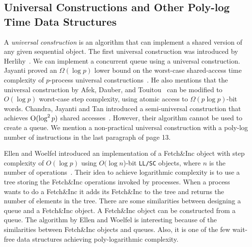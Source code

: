 \subsection{Universal Constructions and Other Poly-log Time Data Structures}
A \textit{universal construction} is an algorithm that can implement a
shared version of any given sequential object. The first universal
construction was introduced by
Herlihy~\cite{10.1145/114005.102808}. We can implement a concurrent
queue using a universal construction. Jayanti proved an $\Omega(\log
p)$ lower bound on the worst-case shared-access time complexity of
$p$-process universal
constructions~\cite{DBLP:conf/podc/Jayanti98a}. He also mentions that
the universal construction by Afek, Dauber, and
Touitou~\cite{DBLP:conf/stoc/AfekDT95} can be modified to $O(\log p)$
worst-case step complexity, using atomic access to $\Omega(p \log
p)$-bit words. Chandra, Jayanti and Tan introduced a semi-universal
construction that achieves $\textsc{O}(\log^2 p)$ shared
accesses~\cite{DBLP:conf/podc/ChandraJT98}. However, their algorithm
cannot be used to create a queue. We mention a non-practical universal
construction with a poly-log number of  instructions in the
last paragraph of page 13. 

Ellen and Woelfel introduced an implementation of a Fetch\&Inc object
with step complexity of $O(\log p)$ using $O(\log n$)-bit
\texttt{LL/SC} objects, where $n$ is the number of
operations~\cite{10.1007/978-3-642-41527-2_20}. Their idea to achieve
logarithmic complexity is to use a tree storing the Fetch\&Inc
operations invoked by processes. When a process wants to do a
Fetch\&Inc it adds its Fetch\&Inc to the tree and returns the number
of elements in the tree. There are some similarities between designing
a queue and a Fetch\&Inc object. A Fetch\&Inc object can be
constructed from a queue. The algorithm by Ellen and Woelfel is
interesting because of the similarities between Fetch\&Inc objects and
queues. Also, it is one of the few wait-free data structures achieving
poly-logarithmic complexity. 

